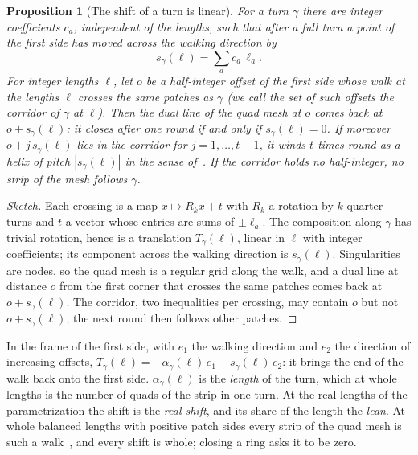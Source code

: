 \documentclass[11pt,a4paper]{article}
\newtheorem{proposition}{Proposition}
\newcommand{\shift}{s}
\newcommand{\lean}[1]{\texttt{\detokenize{#1}}}
\newenvironment{evidence}[3][]{}{}
\begin{document}
\begin{evidence}{core}{\lean{TMesh.Turn.shift_linear}, \lean{TMesh.Turn.mem_corridor_iff}, \lean{TMesh.Turn.comes_back}, \lean{TMesh.Turn.winds}, \lean{TMesh.Turn.development_eq} (in the plane, $T_\gamma(\ell) = -\alpha_\gamma(\ell) e_1 + \shift_\gamma(\ell) e_2$ at whole lengths); examples: \lean{TMesh.twistedTorus.walk_turn}; tested: the development against the holonomy of the word of the turn on 3{,}865 turns of 34 spheres; assumed: an oriented gluing; the corridor without half-integers is not formalized}
\begin{proposition}[The shift of a turn is linear]\label{prop:linear}
For a turn $\gamma$ there are integer coefficients $c_a$, independent of the
lengths, such that after a full turn a point of the first side has moved
across the walking direction by
\[
  \shift_\gamma(\ell) = \sum_a c_a\, \ell_a .
\]
For integer lengths $\ell$, let $o$ be a half-integer offset of the first side
whose walk at the lengths $\ell$ crosses the same patches as $\gamma$ (we call
the set of such offsets the \emph{corridor} of $\gamma$ at $\ell$). Then the
dual line of the quad mesh at $o$ comes back at $o + \shift_\gamma(\ell)$: it
closes after one round if and only if $\shift_\gamma(\ell) = 0$. If moreover
$o + j\,\shift_\gamma(\ell)$ lies in the corridor for $j = 1, \dots, t - 1$, it
winds $t$ times round as a helix of pitch $|\shift_\gamma(\ell)|$ in the sense
of~\cite{bommes2011structure}. If the corridor holds no half-integer, no strip
of the mesh follows $\gamma$.
\end{proposition}
\end{evidence}

\begin{proof}[Sketch]
Each crossing is a map $x \mapsto R_k x + t$ with $R_k$ a rotation by $k$
quarter-turns and $t$ a vector whose entries are sums of $\pm\ell_a$. The
composition along $\gamma$ has trivial rotation, hence is a translation
$T_\gamma(\ell)$, linear in $\ell$ with integer coefficients; its component
across the walking direction is $\shift_\gamma(\ell)$. Singularities are
nodes, so the quad mesh is a regular grid along the walk, and a dual line at
distance $o$ from the first corner that crosses the same patches comes back at
$o + \shift_\gamma(\ell)$. The corridor, two inequalities per crossing, may
contain $o$ but not $o + \shift_\gamma(\ell)$; the next round then follows
other patches.
\end{proof}

In the frame of the first side, with $e_1$ the walking direction and $e_2$
the direction of increasing offsets, $T_\gamma(\ell) = -\alpha_\gamma(\ell)\,
e_1 + \shift_\gamma(\ell)\, e_2$: it brings the end of the walk back onto the
first side. $\alpha_\gamma(\ell)$ is the \emph{length} of the turn, which at whole lengths is the number of
quads of the strip in one turn. At the real lengths of the parametrization the
shift is the \emph{real shift}, and its share of the length the \emph{lean}.
At whole balanced lengths with positive patch sides every strip of the quad
mesh is such a walk~\cite[Prop.~2]{gardent2026loops}, and every shift is
whole; closing a ring asks it to be zero.
\end{document}

